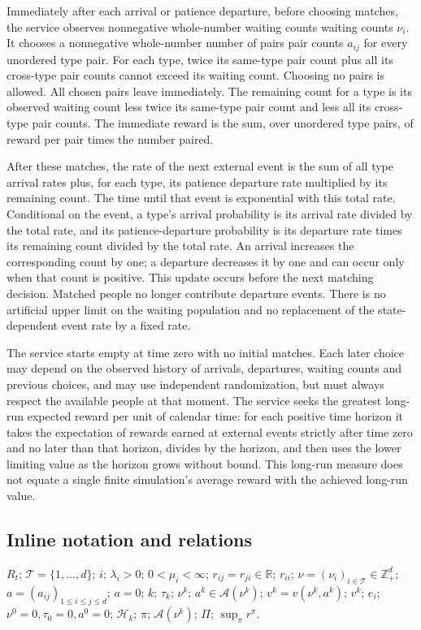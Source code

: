 \documentclass[10pt]{article}
\begin{document}
Immediately after each arrival or patience departure, before choosing matches, the service observes nonnegative whole-number waiting counts waiting counts $\nu_i$. It chooses a nonnegative whole-number number of pairs pair counts $a_{ij}$ for every unordered type pair. For each type, twice its same-type pair count plus all its cross-type pair counts cannot exceed its waiting count. Choosing no pairs is allowed. All chosen pairs leave immediately. The remaining count for a type is its observed waiting count less twice its same-type pair count and less all its cross-type pair counts. The immediate reward is the sum, over unordered type pairs, of reward per pair times the number paired.

After these matches, the rate of the next external event is the sum of all type arrival rates plus, for each type, its patience departure rate multiplied by its remaining count. The time until that event is exponential with this total rate. Conditional on the event, a type's arrival probability is its arrival rate divided by the total rate, and its patience-departure probability is its departure rate times its remaining count divided by the total rate. An arrival increases the corresponding count by one; a departure decreases it by one and can occur only when that count is positive. This update occurs before the next matching decision. Matched people no longer contribute departure events. There is no artificial upper limit on the waiting population and no replacement of the state-dependent event rate by a fixed rate.

The service starts empty at time zero with no initial matches. Each later choice may depend on the observed history of arrivals, departures, waiting counts and previous choices, and may use independent randomization, but must always respect the available people at that moment. The service seeks the greatest long-run expected reward per unit of calendar time: for each positive time horizon it takes the expectation of rewards earned at external events strictly after time zero and no later than that horizon, divides by the horizon, and then uses the lower limiting value as the horizon grows without bound. This long-run measure does not equate a single finite simulation's average reward with the achieved long-run value.

\subsection*{Inline notation and relations}
$R_t$; $\mathcal T=\{1,\ldots,d\}$; $i$; $\lambda_i>0$; $0<\mu_i<\infty$; $r_{ij}=r_{ji}\in\mathbb R$; $r_{ii}$; $\nu=(\nu_i)_{i\in\mathcal T}\in\mathbb Z_+^d$; $a=(a_{ij})_{1\le i\le j\le d}$; $a=0$; $k$; $\tau_k$; $\nu^k$; $a^k\in\mathcal A(\nu^k)$; $v^k=v(\nu^k,a^k)$; $v^k$; $e_i$; $\nu^0=0,\tau_0=0,a^0=0$; $\mathcal H_k$; $\pi$; $\mathcal A(\nu^k)$; $\Pi$; $\sup_\pi r^\pi$.
\end{document}
